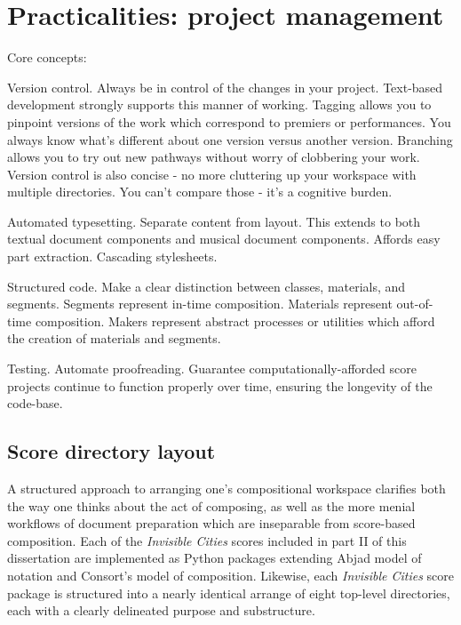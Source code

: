 \chapter{Practicalities: project management}
\label{chap:practicalities}

Core concepts:

Version control. Always be in control of the changes in your project.
Text-based development strongly supports this manner of working.
Tagging allows you to pinpoint versions of the work which correspond to
premiers or performances. You always know what's different about one version
versus another version. Branching allows you to try out new pathways without
worry of clobbering your work. Version control is also concise - no more
cluttering up your workspace with multiple directories. You can't compare those
- it's a cognitive burden.

Automated typesetting. Separate content from layout. This extends to both
textual document components and musical document components. Affords easy part
extraction. Cascading stylesheets.

Structured code. Make a clear distinction between classes, materials, and
segments. Segments represent in-time composition. Materials represent
out-of-time composition. Makers represent abstract processes or utilities which
afford the creation of materials and segments.

Testing. Automate proofreading. Guarantee computationally-afforded score
projects continue to function properly over time, ensuring the longevity of the
code-base.

\section{Score directory layout}

A structured approach to arranging one's compositional workspace clarifies both
the way one thinks about the act of composing, as well as the more menial
workflows of document preparation which are inseparable from score-based
composition. Each of the \emph{Invisible Cities} scores included in part II of
this dissertation are implemented as Python packages extending Abjad model of
notation and Consort's model of composition. Likewise, each \emph{Invisible
Cities} score package is structured into a nearly identical arrange of eight
top-level directories, each with a clearly delineated purpose and substructure.

